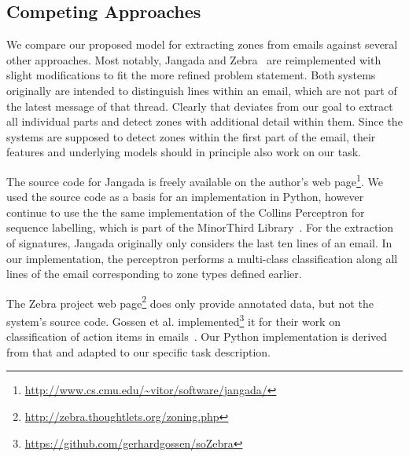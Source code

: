 \documentclass{llncs}
\begin{document}


\subsection{Competing Approaches}
We compare our proposed model for extracting zones from emails against several other approaches.
Most notably, Jangada and Zebra~\cite{zones,signature} are reimplemented with slight modifications to fit the more refined problem statement.
Both systems originally are intended to distinguish lines within an email, which are not part of the latest message of that thread.
Clearly that deviates from our goal to extract all individual parts and detect zones with additional detail within them.
Since the systems are supposed to detect zones within the first part of the email, their features and underlying models should in principle also work on our task.

The source code for Jangada is freely available on the author's web page\footnote{\url{http://www.cs.cmu.edu/~vitor/software/jangada/}}.
We used the source code as a basis for an implementation in Python, however continue to use the the same implementation of the Collins Perceptron for sequence labelling, which is part of the MinorThird Library~\cite{minorthird,cperceptron}.
For the extraction of signatures, Jangada originally only considers the last ten lines of an email.
In our implementation, the perceptron performs a multi-class classification along all lines of the email corresponding to zone types defined earlier.

The Zebra project web page\footnote{\url{http://zebra.thoughtlets.org/zoning.php}} does only provide annotated data, but not the system's source code. 
Gossen et al. implemented\footnote{\url{https://github.com/gerhardgossen/soZebra}} it for their work on classification of action items in emails~\cite{sozebra}.
Our Python implementation is derived from that and adapted to our specific task description.
\end{document}
